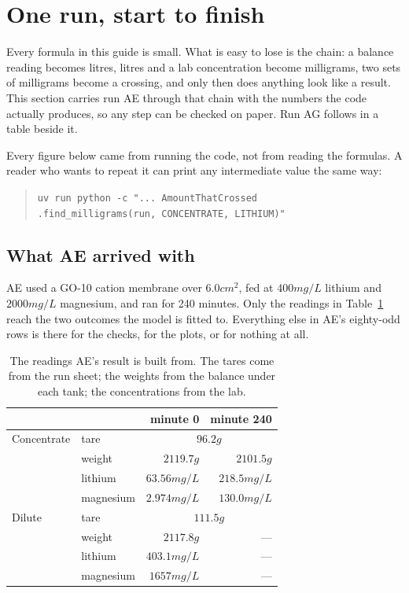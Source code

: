 \section{One run, start to finish}

Every formula in this guide is small. What is easy to lose is the chain: a balance reading
becomes litres, litres and a lab concentration become milligrams, two sets of milligrams
become a crossing, and only then does anything look like a result. This section carries run
AE through that chain with the numbers the code actually produces, so any step can be checked
on paper. Run AG follows in a table beside it.

Every figure below came from running the code, not from reading the formulas. A reader who
wants to repeat it can print any intermediate value the same way:

\begin{quote}
\texttt{uv run python -c "... AmountThatCrossed} \\
\texttt{.find\_milligrams(run, CONCENTRATE, LITHIUM)"}
\end{quote}

\subsection{What AE arrived with}

AE used a GO-10 cation membrane over $6.0\unit{cm^2}$, fed at $400\unit{mg/L}$ lithium and
$2000\unit{mg/L}$ magnesium, and ran for 240 minutes. Only the readings in
Table~\ref{tab:ae-inputs} reach the two outcomes the model is fitted to. Everything else in
AE's eighty-odd rows is there for the checks, for the plots, or for nothing at all.

\begin{table}[htbp]
\centering
\caption{The readings AE's result is built from. The tares come from the run sheet; the
weights from the balance under each tank; the concentrations from the lab.}
\label{tab:ae-inputs}
\begin{tabular}{llrr}
\toprule
 & & minute 0 & minute 240 \\
\midrule
Concentrate & tare & \multicolumn{2}{c}{$96.2\unit{g}$} \\
            & weight            & $2119.7\unit{g}$ & $2101.5\unit{g}$ \\
            & lithium           & $63.56\unit{mg/L}$ & $218.5\unit{mg/L}$ \\
            & magnesium         & $2.974\unit{mg/L}$ & $130.0\unit{mg/L}$ \\
\addlinespace
Dilute      & tare & \multicolumn{2}{c}{$111.5\unit{g}$} \\
            & weight            & $2117.8\unit{g}$ & --- \\
            & lithium           & $403.1\unit{mg/L}$ & --- \\
            & magnesium         & $1657\unit{mg/L}$ & --- \\
\bottomrule
\end{tabular}
\end{table}

